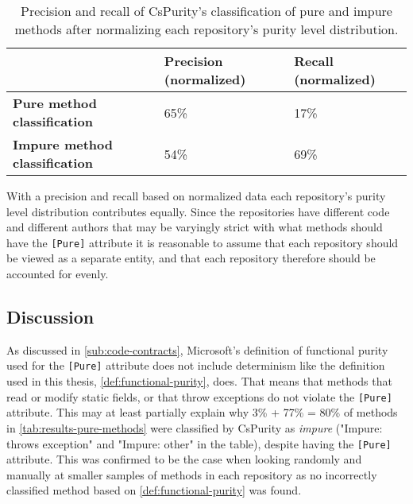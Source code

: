 \documentclass[a4paper,12pt]{article}
\begin{document}
\begin{table}[H]
  \centering
  \caption{Precision and recall of CsPurity's classification of pure and impure methods after normalizing each repository's purity level distribution.}
  \label{tab:results-precision-recall-normalized}
  \begin{tabular}{|l|ll|}
    \hline
                                          & \textbf{Precision (normalized)} & \textbf{Recall (normalized)} \\
    \hline
    \textbf{Pure method classification}   & 65\%                            & 17\%                         \\
    \textbf{Impure method classification} & 54\%                            & 69\%                         \\
    \hline
  \end{tabular}
\end{table}

With a precision and recall based on normalized data each repository's purity level distribution contributes equally. %
Since the repositories have different code and different authors that may be varyingly strict with what methods should have the \texttt{[Pure]} attribute it is reasonable to assume that each repository should be viewed as a separate entity, and that each repository therefore should be accounted for evenly.

\subsection{Discussion} \label{sub:discussion}

As discussed in \autoref{sub:code-contracts}, Microsoft's definition of functional purity used for the \texttt{[Pure]} attribute does not include determinism like the definition used in this thesis, \autoref{def:functional-purity}, does. That means that methods that read or modify static fields, or that throw exceptions do not violate the \texttt{[Pure]} attribute. This may at least partially explain why 3\% + 77\% = 80\% of methods in \autoref{tab:results-pure-methods} were classified by CsPurity as \textit{impure} ("Impure: throws exception" and "Impure: other" in the table), despite having the \texttt{[Pure]} attribute. This was confirmed to be the case when looking randomly and manually at smaller samples of methods in each repository as no incorrectly classified method based on \autoref{def:functional-purity} was found.
\end{document}

